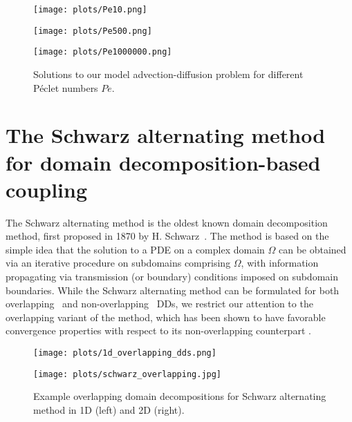 \documentclass[oneside,final]{csri23}
\begin{document}
\begin{figure}[htbp!]
    \begin{minipage}{0.45\linewidth}
        \texttt{[image: plots/Pe10.png]}
    \end{minipage}
    \begin{minipage}{0.45\linewidth}
        \texttt{[image: plots/Pe500.png]}
    \end{minipage}
    \begin{center}
    \begin{minipage}{0.45\linewidth}
        \texttt{[image: plots/Pe1000000.png]}
    \end{minipage}
    \end{center}
	\caption{Solutions to our model advection-diffusion problem for different P\'{e}clet numbers $Pe$.}
    \label{fig:adv-diff-Pe}
\end{figure}


\section{The Schwarz alternating method for domain decomposition-based coupling}\label{WDS:sec:Schwarz}

The Schwarz alternating method is the oldest known domain decomposition method, first proposed in 1870 by H. Schwarz~\cite{WDS:schwarz1870ueber}. The method is based on the simple idea that the solution to a PDE on a complex domain $\Omega$ can be obtained via an iterative procedure on subdomains comprising $\Omega$, with information propagating via transmission (or boundary) conditions imposed on subdomain boundaries. While the Schwarz alternating method can be formulated for both overlapping~\cite{WDS:mota2017schwarz, WDS:mota2022schwarz, WDS:Lions1988} and non-overlapping~\cite{WDS:barnett2022schwarz, WDS:Koliesnikova2023, WDS:Hoy2021} DDs, we restrict our attention to the overlapping variant of the method, which has been shown to have favorable convergence properties with respect to its non-overlapping counterpart \cite{WDS:barnett2022schwarz}.  


\begin{figure}[htbp!]
        \begin{minipage}{0.49\linewidth}
            \texttt{[image: plots/1d\_overlapping\_dds.png]}
        \end{minipage}
        \begin{minipage}{0.49\linewidth}
            \texttt{[image: plots/schwarz\_overlapping.jpg]}
        \end{minipage}
            
	\caption{Example overlapping domain decompositions for Schwarz alternating method in 1D (left) and 2D (right).}
    \label{fig:dds}
\end{figure}
\end{document}
